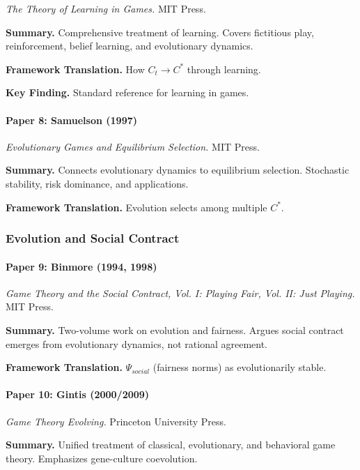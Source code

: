 \textit{The Theory of Learning in Games.}
MIT Press.

\textbf{Summary.}
Comprehensive treatment of learning. Covers fictitious play, reinforcement, 
belief learning, and evolutionary dynamics.

\textbf{Framework Translation.}
How $C_t \to C^*$ through learning.

\textbf{Key Finding.}
Standard reference for learning in games.

\paragraph{Paper 8: Samuelson (1997)}

\textit{Evolutionary Games and Equilibrium Selection.}
MIT Press.

\textbf{Summary.}
Connects evolutionary dynamics to equilibrium selection. Stochastic stability, 
risk dominance, and applications.

\textbf{Framework Translation.}
Evolution selects among multiple $C^*$.

\subsubsection{Evolution and Social Contract}

\paragraph{Paper 9: Binmore (1994, 1998)}

\textit{Game Theory and the Social Contract, Vol. I: Playing Fair, Vol. II: Just Playing.}
MIT Press.

\textbf{Summary.}
Two-volume work on evolution and fairness. Argues social contract emerges 
from evolutionary dynamics, not rational agreement.

\textbf{Framework Translation.}
$\Psi_{social}$ (fairness norms) as evolutionarily stable.

\paragraph{Paper 10: Gintis (2000/2009)}

\textit{Game Theory Evolving.}
Princeton University Press.

\textbf{Summary.}
Unified treatment of classical, evolutionary, and behavioral game theory.
Emphasizes gene-culture coevolution.

